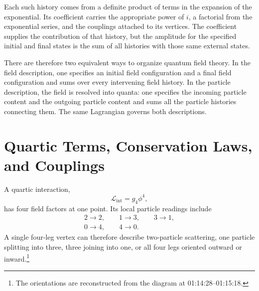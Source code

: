 Each such history comes from a definite product of terms in the expansion of the exponential. Its coefficient carries the appropriate power of \(i\), a factorial from the exponential series, and the couplings attached to its vertices. The coefficient supplies the contribution of that history, but the amplitude for the specified initial and final states is the sum of all histories with those same external states.

\begin{classroomqa}
\end{classroomqa}

There are therefore two equivalent ways to organize quantum field theory. In the field description, one specifies an initial field configuration and a final field configuration and sums over every intervening field history. In the particle description, the field is resolved into quanta: one specifies the incoming particle content and the outgoing particle content and sums all the particle histories connecting them. The same Lagrangian governs both descriptions.

\section{Quartic Terms, Conservation Laws, and Couplings}

A quartic interaction,
\begin{equation}
\mathcal{L}_{\mathrm{int}}=g_4\phi^4,
\end{equation}
has four field factors at one point. Its local particle readings include
\begin{equation}
\begin{gathered}
2\longrightarrow2,
\qquad
1\longrightarrow3,
\qquad
3\longrightarrow1,\\
0\longrightarrow4,
\qquad
4\longrightarrow0.
\end{gathered}
\end{equation}
A single four-leg vertex can therefore describe two-particle scattering, one particle splitting into three, three joining into one, or all four legs oriented outward or inward.\footnote{The orientations are reconstructed from the diagram at 01:14:28--01:15:18.}

